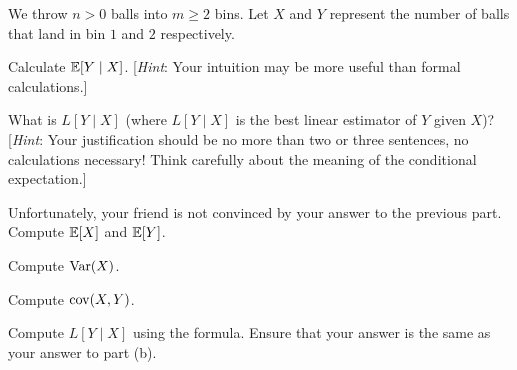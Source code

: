 \documentclass[11pt]{article}
\begin{document}
We throw $n > 0$ balls into $m \geq 2$ bins. Let $X$ and $Y$ represent the number of balls that land in bin $1$ and $2$ respectively.

\begin{Parts}

    \Part Calculate $\operatorname{\mathbb{E}}[Y \mid X]$. [\textit{Hint}: Your intuition may be more useful than formal calculations.]

    \Part What is $L[Y \mid X]$ (where $L[Y \mid X]$ is the best linear estimator of $Y$ given $X$)? [\textit{Hint}: Your justification should be no more than two or three sentences, no calculations necessary! Think carefully about the meaning of the conditional expectation.]

  \Part Unfortunately, your friend is not convinced by your answer to the previous part. Compute $\operatorname{\mathbb{E}}[X]$ and $\operatorname{\mathbb{E}}[Y]$.

  \Part Compute $\operatorname{Var}(X)$.

  \Part Compute $\operatorname{cov}(X, Y)$.

  \Part Compute $L[Y \mid X]$ using the formula. Ensure that your answer is the same as your answer to part (b).

\end{Parts}
\end{document}
